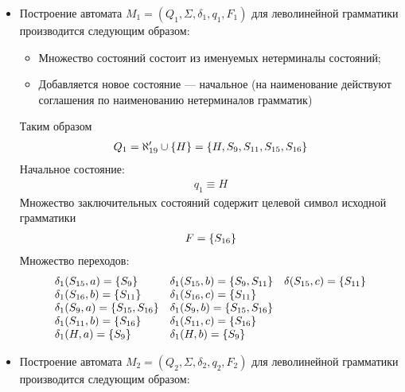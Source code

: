 \begin{itemize}
	\item Построение автомата \(M_1 = (Q_1, \Sigma, \delta_1, q_1, F_1)\) для леволинейной грамматики производится следующим образом:
	      \begin{itemize}
		      \item Множество состояний состоит из именуемых нетерминалы состояний;
		      \item Добавляется новое состояние --- начальное (на наименование действуют соглашения по наименованию нетерминалов грамматик)
	      \end{itemize}
	      Таким образом
	      \begin{align*}
		      Q_1 = \aleph'_{19} \cup \left\{H\right\} = \left\{H, S_9, S_{11}, S_{15}, S_{16}\right\}
	      \end{align*}
	      Начальное состояние:
	      \begin{align*}
		      q_1 \equiv H
	      \end{align*}
	      Множество заключительных состояний содержит целевой символ исходной грамматики
	      \begin{align*}
		      F = \left\{S_{16}\right\}
	      \end{align*}
	      Множество переходов:
	      \begin{align*}
		      \begin{array}{lll}
			      \delta_1(S_{15}, a) = \left\{S_9\right\}           & \delta_1(S_{15}, b) = \left\{S_9, S_{11}\right\}   & \delta(S_{15}, c) = \left\{S_{11}\right\} \\
			      \delta_1(S_{16}, b) = \left\{S_{11}\right\}        & \delta_1(S_{16}, c) = \left\{S_{11}\right\}                                           \\
			      \delta_1(S_{9}, a) = \left\{S_{15}, S_{16}\right\} & \delta_1(S_{9}, b) = \left\{S_{15}, S_{16}\right\}                                    \\
			      \delta_1(S_{11}, b) = \left\{S_{16}\right\}        & \delta_1(S_{11}, c) = \left\{S_{16}\right\}                                           \\
			      \delta_1(H, a) = \left\{S_{9}\right\}              & \delta_1(H, b) = \left\{S_{9}\right\}
		      \end{array}
	      \end{align*}
	\item Построение автомата \(M_2 = (Q_2, \Sigma, \delta_2, q_2, F_2)\) для леволинейной грамматики производится следующим образом:

\end{itemize}
